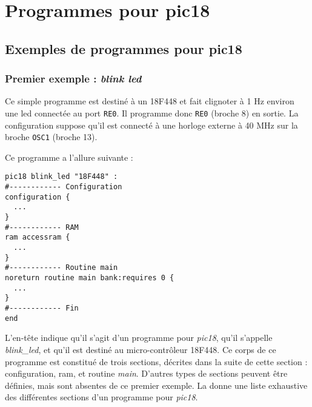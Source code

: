
\cleardoublepage

\chapter{Programmes pour pic18}

\thispagestyle{empty}




\section{Exemples de programmes pour pic18}

\subsection{Premier exemple : \emph{blink led}}

Ce simple programme est destiné à un 18F448 et fait clignoter à 1 Hz environ une led connectée au port \texttt{RE0}. Il programme donc \texttt{RE0} (broche 8) en sortie. La configuration suppose qu'il est connecté à une horloge externe à 40 MHz sur la broche \texttt{OSC1} (broche 13). 

Ce programme a l'allure suivante :
\begin{lstlisting}[language=piccolo]
pic18 blink_led "18F448" :
#------------ Configuration
configuration {
  ...
}
#------------ RAM
ram accessram {
  ...
}
#------------ Routine main
noreturn routine main bank:requires 0 {
  ...
}
#------------ Fin
end
\end{lstlisting}

L'en-tête indique qu'il s'agit d'un programme pour \emph{pic18}, qu'il s'appelle \emph{blink\_led}, et qu'il est destiné au micro-contrôleur 18F448. Ce corps de ce programme est constitué de trois sections, décrites dans la suite de cette section : configuration, ram, et routine \emph{main}. D'autres types de sections peuvent être définies, mais sont absentes de ce premier exemple. La  donne une liste exhaustive des différentes sections d'un programme pour \emph{pic18}. 

